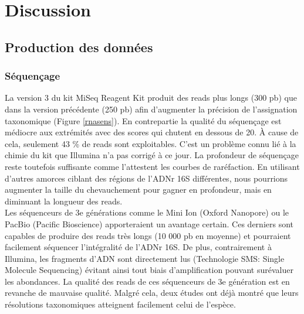 \documentclass[12pt,a4paper]{article}
\begin{document}
\newpage
\section{Discussion}
\subsection{Production des données}
\subsubsection{Séquençage}
La version 3 du kit MiSeq Reagent Kit produit des reads plus longs (300 pb) que dans la version précédente (250 pb) afin d'augmenter la précision de l'assignation taxonomique (Figure \ref{rnasens}). En contrepartie la qualité du séquençage est médiocre aux extrémités avec des scores qui chutent en dessous de 20. À cause de cela, seulement 43 \% de reads sont exploitables.
C'est un problème connu lié à la chimie du kit que Illumina n'a pas corrigé à ce jour. La profondeur de séquençage reste toutefois suffisante comme l'attestent les courbes de raréfaction. En utilisant d'autres amorces ciblant des régions de l'ADNr 16S différentes, nous pourrions augmenter la taille du chevauchement pour gagner en profondeur, mais en diminuant la longueur des reads. \\
Les séquenceurs de 3e générations comme le Mini Ion (Oxford Nanopore) ou le PacBio (Pacific Bioscience) apporteraient un avantage certain. Ces derniers sont capables de produire des reads très longs (10 000 pb en moyenne) et pourraient facilement séquencer l'intégralité de l'ADNr 16S. De plus, contrairement à Illumina, les fragments d'ADN sont directement lus (Technologie SMS: Single Molecule Sequencing) évitant ainsi tout biais d'amplification pouvant surévaluer les abondances.
La qualité des reads de ces séquenceurs de 3e génération est en revanche de mauvaise qualité. Malgré cela, deux études\cite{Wagner2016,Benitez-Paez2016} ont déjà montré que leurs résolutions taxonomiques atteignent facilement celui de l’espèce.
\end{document}
